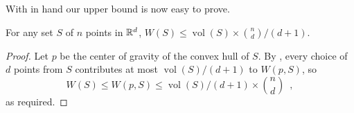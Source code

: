 \documentclass[lotsofwhite]{patmorin}
\DeclareMathOperator{\vol}{vol}
\begin{document}
With  in hand our upper bound is now easy to prove.

\begin{thm}
For any set $S$ of $n$ points in $\mathbb{R}^d$, $W(S) \le \vol(S)\times {n \choose
d}/(d+1)$.
\end{thm}

\begin{proof}
Let $p$ be the center of gravity of the convex hull of $S$.  By
,
every choice of $d$ points from $S$ contributes at most
$\vol(S)/(d+1)$ to $W(p,S)$, so
\[
    W(S) \le W(p,S) \le \vol(S)/(d+1)\times {n\choose d} \enspace ,
\]
as required.
\end{proof}
\end{document}
